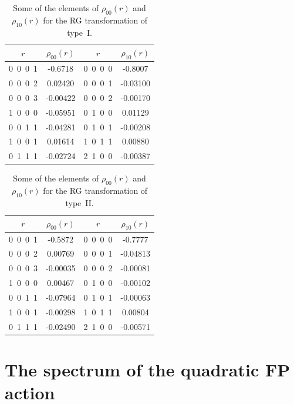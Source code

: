 \begin{table}
\begin{center}
\begin{tabular}{c c | c  c}      \hline
  $r$     &    $\rho_{00}(r)$  & $r$ &  $\rho_{10}(r)$ \\   \hline
0~0~0~1 & -0.6718  & 0~0~0~0 &    -0.8007       \\
0~0~0~2 &  0.02420 & 0~0~0~1 &    -0.03100       \\
0~0~0~3 & -0.00422 & 0~0~0~2 &    -0.00170       \\
1~0~0~0 & -0.05951 & 0~1~0~0 &     0.01129       \\
0~0~1~1 & -0.04281 & 0~1~0~1 &    -0.00208       \\
1~0~0~1 &  0.01614 & 1~0~1~1 &     0.00880       \\
0~1~1~1 & -0.02724 & 2~1~0~0 &    -0.00387       \\
\hline
\end{tabular}
\end{center}
\caption{Some of the elements of $\rho_{00}(r)$ and $\rho_{10}(r)$
for the RG transformation of type~I.}
\label{tab:type1}
\end{table}

\begin{table}
\begin{center}
\begin{tabular}{c c | c c}      \hline
  $r$     &    $\rho_{00}(r)$  & $r$ &  $\rho_{10}(r)$ \\   \hline
0~0~0~1 & -0.5872  & 0~0~0~0 &    -0.7777       \\
0~0~0~2 &  0.00769 & 0~0~0~1 &    -0.04813       \\
0~0~0~3 & -0.00035 & 0~0~0~2 &    -0.00081       \\
1~0~0~0 &  0.00467 & 0~1~0~0 &    -0.00102       \\
0~0~1~1 & -0.07964 & 0~1~0~1 &    -0.00063       \\
1~0~0~1 & -0.00298 & 1~0~1~1 &     0.00804       \\
0~1~1~1 & -0.02490 & 2~1~0~0 &    -0.00571       \\
\hline
\end{tabular}
\end{center}
\caption{Some of the elements of $\rho_{00}(r)$ and $\rho_{10}(r)$ 
for the RG transformation of type~II.}
\label{tab:type2}
\end{table}

\section{The spectrum of the quadratic FP action}

